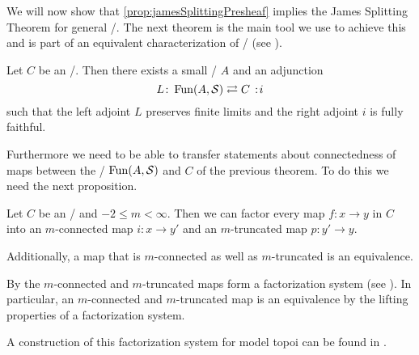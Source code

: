 We will now show that \cref{prop:jamesSplittingPresheaf} implies the James Splitting Theorem for general \inftytops/.
The next theorem is the main tool we use to achieve this and is part of an equivalent characterization of \inftytops/ (see \cite[Theorem 6.1.0.6]{HTT}).
\begin{thm}\label{thm:charTopoiByAdj}
    Let $C$ be an \inftytop/.
    Then there exists a small \inftycat/ $A$ and an adjunction
    \begin{equation*}
        L\colon\Fun(A,\spaces)\rightleftarrows C\mkern+3mu:\mkern-3mu i
    \end{equation*}
    such that the left adjoint $L$ preserves finite limits and the right adjoint $i$ is fully faithful.
    \begin{reference}
        \cite[Theorem 6.1.0.6 (1) and (2)]{HTT} %
    \end{reference}
\end{thm}
Furthermore we need to be able to transfer statements about connectedness of maps between the \inftytops/ $\operatorname{Fun}(A,\mathcal{S})$ and $C$ of the previous theorem.
To do this we need the next proposition.
\begin{prop}\label{prop:factorConnTrunc} %
    Let $C$ be an \inftytop/ and $-2\leq m<\infty$.
    Then we can factor every map $f\colon x\to y$ in $C$ into an $m$-connected map $i\colon x\to y'$ and an $m$-truncated map $p\colon y'\to y$.
    
    Additionally, a map that is $m$-connected as well as $m$-truncated is an equivalence.
    \begin{reference}
        By \cite[\S 6.5.1 and Example 5.2.8.16]{HTT} the $m$-connected and $m$-truncated maps form a factorization system (see \cite[Definition 5.2.8.8]{HTT}).
        In particular, an $m$-connected and $m$-truncated map is an equivalence by the lifting properties of a factorization system.

        A construction of this factorization system for model topoi can be found in \cite[Proposition 8.5]{toposes_and_htpy_toposes}.
    \end{reference}
\end{prop}
